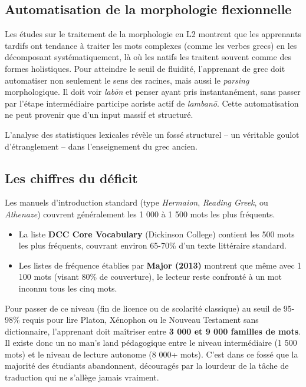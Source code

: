 {\subsection{Automatisation de la morphologie flexionnelle}

Les études sur le traitement de la morphologie en L2 montrent que les apprenants tardifs ont
tendance à traiter les mots complexes (comme les verbes grecs) en les décomposant systématiquement,
là où les natifs les traitent souvent comme des formes holistiques.\cite{II-3-2-ref42} Pour
atteindre le seuil de fluidité, l'apprenant de grec doit automatiser non seulement le sens des
racines, mais aussi le \textit{parsing} morphologique. Il doit voir \textit{labōn} et penser \og
ayant pris\fg{} instantanément, sans passer par l'étape intermédiaire \og participe aoriste actif de
\textit{lambanō}\fg{}. Cette automatisation ne peut provenir que d'un input massif et
structuré.\cite{II-3-2-ref29}

L'analyse des statistiques lexicales révèle un fossé structurel – un véritable \og goulot
d'étranglement\fg{} – dans l'enseignement du grec ancien.



\subsection{Les chiffres du déficit}

Les manuels d'introduction standard (type \textit{Hermaion}, \textit{Reading Greek}, ou
\textit{Athenaze}) couvrent généralement les 1 000 à 1 500 mots les plus fréquents.

\begin{itemize}\item La liste \textbf{DCC Core Vocabulary} (Dickinson College) contient les 500 mots les plus fréquents, couvrant environ 65-70\% d'un texte littéraire standard.\cite{II-3-2-ref45}\item Les listes de fréquence établies par \textbf{Major (2013)} montrent que même avec 1 100 mots (visant 80\% de couverture), le lecteur reste confronté à un mot inconnu tous les cinq mots.\cite{II-3-2-ref47}\end{itemize}Pour passer de ce niveau (fin de licence ou de scolarité classique) au seuil de 95-98\% requis pour
lire Platon, Xénophon ou le Nouveau Testament sans dictionnaire, l'apprenant doit maîtriser entre
\textbf{3 000 et 9 000 familles de mots}.\cite{II-3-2-ref9} Il existe donc un \og no man's land\fg{}
pédagogique entre le niveau intermédiaire (1 500 mots) et le niveau de lecture autonome (8 000+
mots). C'est dans ce fossé que la majorité des étudiants abandonnent, découragés par la lourdeur de
la tâche de traduction qui ne s'allège jamais vraiment.\cite{II-3-2-ref48}



}
